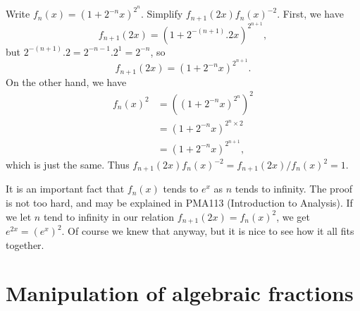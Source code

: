 \documentclass[a4paper]{book}
\newcommand{\tm}        {\times}
\renewcommand{\:}{\colon}
\newcommand{\PMA}[1]{PMA#1}
\theoremstyle{definition}
\newenvironment{starex}{
 \renewcommand{\thetheorem}{\arabic{chapter}.\arabic{section}.\arabic{theorem}${}^*$}
 \exercise
}{\endexercise}
\renewenvironment{solution}{\SolutionInline}{\endSolutionInline}
\begin{document}
\begin{starex}
 Write $f_n(x)=(1+2^{-n}x)^{2^n}$.  Simplify
 $f_{n+1}(2x)f_n(x)^{-2}$. 
\end{starex}
\begin{solution}
 First, we have
 \[ f_{n+1}(2x)=(1+2^{-(n+1)}.2x)^{2^{n+1}}, \]
 but $2^{-(n+1)}.2=2^{-n-1}.2^1=2^{-n}$, so
 \[ f_{n+1}(2x)=(1+2^{-n}x)^{2^{n+1}}. \]
 On the other hand, we have
 \begin{align*}
  f_n(x)^2 &= \left((1+2^{-n}x)^{2^n}\right)^2 \\
           &= (1+2^{-n}x)^{2^n\tm 2} \\
           &= (1+2^{-n}x)^{2^{n+1}},
 \end{align*}
 which is just the same.  Thus 
 $f_{n+1}(2x)f_n(x)^{-2}=f_{n+1}(2x)/f_n(x)^2=1$.

 It is an important fact that $f_n(x)$ tends to $e^x$ as $n$ tends to
 infinity.  The proof is not too hard, and may be explained in
 \PMA{113} (Introduction to Analysis).  If we let $n$ tend to infinity
 in our relation $f_{n+1}(2x)=f_n(x)^2$, we get $e^{2x}=(e^x)^2$.  Of
 course we knew that anyway, but it is nice to see how it all fits
 together. 
\end{solution}

\section{Manipulation of algebraic fractions}
\label{sec-fract}
\end{document}
